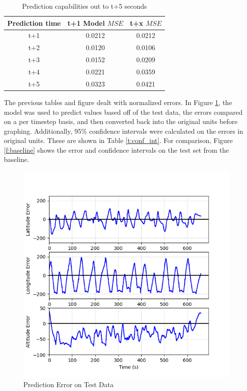 \documentclass[10pt]{IEEEtran}
\begin{document}
\begin{table}
    \caption{Prediction capabilities out to t+5 seconds}
    \centering
    \begin{tabular}{ccc}
        \hline
        \textbf{Prediction time}& \textbf{t+1 Model $MSE$} & \textbf{t+x $MSE$}\\
        \hline
        t+1 & 0.0212 & 0.0212\\
        t+2 & 0.0120 & 0.0106\\
        t+3 & 0.0152 & 0.0209\\
        t+4 & 0.0221 & 0.0359\\
        t+5 & 0.0323 & 0.0421\\
        \hline
    \end{tabular}
    \label{t:time_study}
\end{table}

The previous tables and figure dealt with normalized errors. In Figure \ref{f:errors}, the model was used to predict values based off of the test data, the errors compared on a per timestep basis, and then converted back into the original units before graphing. Additionally, 95\% confidence intervals were calculated on the errors in original units. These are shown in Table \ref{t:conf_int}. For comparison, Figure \ref{f:baseline} shows the error and confidence intervals on the test set from the baseline.

\begin{figure}
    \includegraphics[width=0.95\columnwidth]{test_error.png}
    \caption{Prediction Error on Test Data}
    \label{f:errors}
\end{figure}
\end{document}
